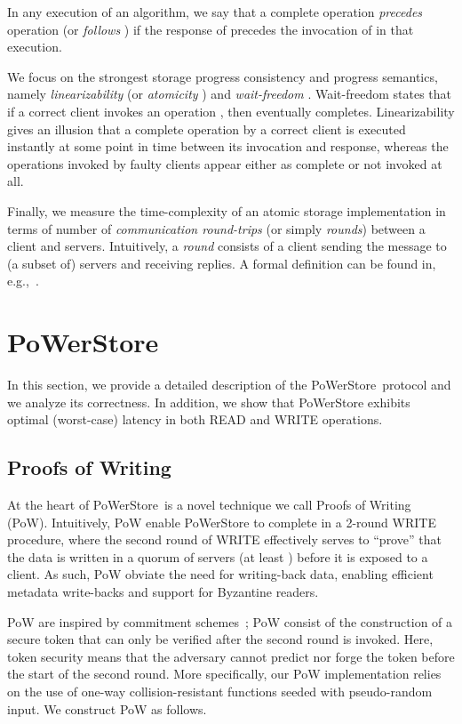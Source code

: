 \documentclass[10pt,conference,compsocconf]{IEEEtran}
\newcommand{\protocol}{PoWerStore}
\begin{document}
In any execution of an algorithm, we say that a complete
operation  \emph{precedes} operation  (or  \emph{follows} )
if the response of  precedes the invocation of
 in that execution.


We focus on the strongest storage progress consistency and progress semantics, namely \emph{linearizability} \cite{HW90} (or \emph{atomicity} \cite{Lam86}) and \emph{wait-freedom} \cite{Her91}.
Wait-freedom states that if a correct client invokes an operation , then
 eventually completes. Linearizability gives an illusion that a complete operation  by a correct client is executed instantly at some point in time between its invocation and response,  whereas the operations invoked by faulty clients appear either as complete or not invoked at all.

Finally, we measure the time-complexity of an atomic storage
implementation in terms of number of \emph{communication round-trips}
(or simply \emph{rounds}) between a client and servers. Intuitively, a \emph{round} consists of a client sending the message to (a subset of) servers and receiving replies. A formal definition can be found in, e.g.,~\cite{GNS09,DGLV10}.


\section{\protocol}\label{sec:pow}
In this section, we provide a detailed description of the \protocol\ protocol and we analyze its correctness. In addition, we show that \protocol{} exhibits
optimal (worst-case) latency in both \textsc{READ} and \textsc{WRITE} operations.

\subsection{Proofs of Writing}

At the heart of \protocol\ is a novel technique we call Proofs of Writing (PoW). Intuitively, PoW enable \protocol{} to complete in a 2-round \textsc{WRITE} procedure, where the second round of \textsc{WRITE} effectively serves to ``prove'' that the data is written in a quorum of servers (at least ) before it is exposed to a client. As such, PoW obviate the need for writing-back data, enabling efficient metadata write-backs and support for Byzantine readers.

PoW are inspired by commitment schemes~\cite{Halevi1996}; PoW consist of the construction of a secure token that can only be verified after the second round is invoked. Here, token security means that the adversary cannot predict nor forge the token before the start of the second round.
More specifically, our PoW implementation relies on the use of one-way collision-resistant functions seeded with pseudo-random input. We construct PoW as follows.
\end{document}
